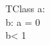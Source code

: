 \documentclass{article}
\begin{document}
\begin{zed}
  [DNI]
\end{zed}



\begin{schema}{TClass}
	a: \nat \\
	b: \nat
\where
	a = 0 \\
	b< 1

\end{schema}
\end{document}
